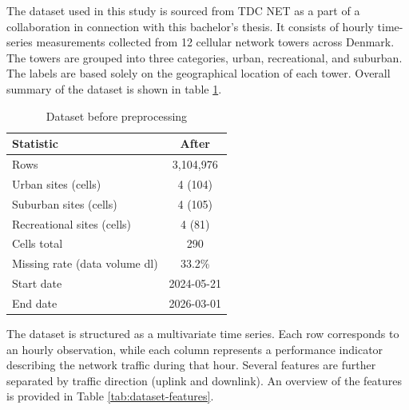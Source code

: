 The dataset used in this study is sourced from TDC NET as a part of a collaboration in connection with this bachelor’s thesis. It consists of hourly time-series measurements collected from 12 cellular network towers across Denmark. The towers are grouped into three categories, urban, recreational, and suburban. The labels are based solely on the geographical location of each tower. Overall summary of the dataset is shown in table \ref{tab:before_pre}. 

\begin{table}[h]
\centering
\caption{Dataset before preprocessing}
\begin{tabular}{lc}
\hline
\textbf{Statistic} & \textbf{After} \\
\hline
Rows & 3,104,976 \\
Urban sites (cells) & 4 (104) \\
Suburban sites (cells) & 4 (105) \\
Recreational sites (cells) & 4 (81) \\
Cells total & 290 \\
Missing rate (data volume dl) & 33.2\% \\
Start date & 2024-05-21 \\
End date & 2026-03-01 \\
\hline
\end{tabular}
\label{tab:before_pre}
\end{table}

The dataset is structured as a multivariate time series. Each row corresponds to an hourly observation, while each column represents a performance indicator describing the network traffic during that hour. Several features are further separated by traffic direction (uplink and downlink). An overview of the features is provided in Table \ref{tab:dataset-features}.


